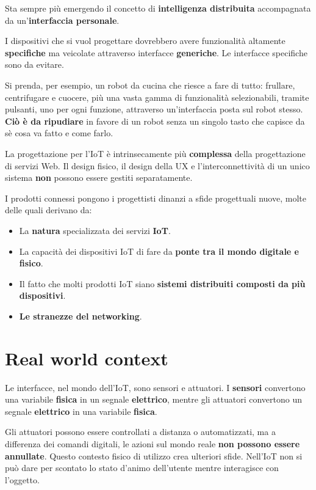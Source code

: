 Sta sempre più emergendo il concetto di \textbf{intelligenza distribuita} accompagnata da un'\textbf{interfaccia personale}.

I dispositivi che si vuol progettare dovrebbero avere funzionalità altamente \textbf{specifiche} ma veicolate attraverso interfacce \textbf{generiche}. Le interfacce specifiche sono da evitare.

Si prenda, per esempio, un robot da cucina che riesce a fare
di tutto: frullare, centrifugare e cuocere, più una vasta gamma di funzionalità selezionabili, tramite pulsanti, uno per ogni funzione, attraverso un'interfaccia posta sul robot stesso. \textbf{Ciò è da ripudiare} in favore di un robot senza un singolo tasto che capisce da sè cosa va fatto e come farlo.

La progettazione per l'IoT è intrinsecamente più \textbf{complessa} della progettazione di servizi Web. Il design fisico, il design della UX e l'interconnettività di un unico sistema \textbf{non} possono essere gestiti separatamente.

I prodotti connessi pongono i progettisti dinanzi a sfide progettuali nuove, molte delle quali derivano da:

\begin{itemize}
	\item La \textbf{natura} specializzata dei servizi \textbf{IoT}.
	\item La capacità dei dispositivi IoT di fare da \textbf{ponte tra il mondo digitale e fisico}.
	\item Il fatto che molti prodotti IoT siano \textbf{sistemi distribuiti composti da più dispositivi}.
	\item \textbf{Le stranezze del networking}.
\end{itemize}

\pagebreak

\section{Real world context}
Le interfacce, nel mondo dell'IoT, sono sensori e attuatori. I \textbf{sensori} convertono una variabile \textbf{fisica} in un segnale \textbf{elettrico}, mentre gli
attuatori convertono un segnale\textbf{ elettrico} in una variabile \textbf{fisica}.

Gli attuatori possono essere controllati a distanza o automatizzati, ma a differenza dei comandi digitali, le azioni sul mondo reale \textbf{non possono essere annullate}.
Questo contesto fisico di utilizzo crea ulteriori sfide. Nell'IoT non si può dare per
scontato lo stato d'animo dell'utente mentre interagisce con l'oggetto.

